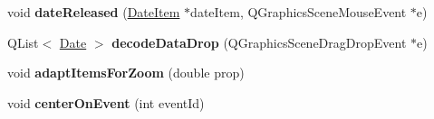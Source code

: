 \begin{DoxyCompactItemize}
\item 
\hypertarget{class_events_scene_a71ce58580b9889c197a8059afb5e75f8}{void {\bfseries date\-Released} (\hyperlink{class_date_item}{Date\-Item} $\ast$date\-Item, Q\-Graphics\-Scene\-Mouse\-Event $\ast$e)}\label{class_events_scene_a71ce58580b9889c197a8059afb5e75f8}

\item 
\hypertarget{class_events_scene_a63f942dfac5597a690672dd714bfa693}{Q\-List$<$ \hyperlink{class_date}{Date} $>$ {\bfseries decode\-Data\-Drop} (Q\-Graphics\-Scene\-Drag\-Drop\-Event $\ast$e)}\label{class_events_scene_a63f942dfac5597a690672dd714bfa693}

\item 
\hypertarget{class_events_scene_a233a93e032cca098ce69ece741873031}{void {\bfseries adapt\-Items\-For\-Zoom} (double prop)}\label{class_events_scene_a233a93e032cca098ce69ece741873031}

\item 
\hypertarget{class_events_scene_ac934188fdf58ccdbf21f238ca7f4cf75}{void {\bfseries center\-On\-Event} (int event\-Id)}\label{class_events_scene_ac934188fdf58ccdbf21f238ca7f4cf75}

\end{DoxyCompactItemize}
